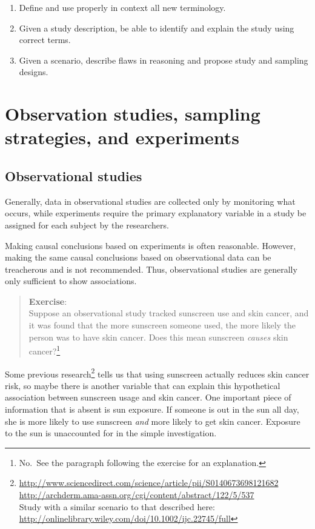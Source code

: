 \documentclass[
]{book}
\providecommand{\tightlist}{%
  \setlength{\itemsep}{0pt}\setlength{\parskip}{0pt}}
\begin{document}
\begin{enumerate}
\def\labelenumi{\arabic{enumi})}
\tightlist
\item
  Define and use properly in context all new terminology.\\
\item
  Given a study description, be able to identify and explain the study using correct terms.\\
\item
  Given a scenario, describe flaws in reasoning and propose study and sampling designs.
\end{enumerate}

\hypertarget{observation-studies-sampling-strategies-and-experiments}{%
\section{Observation studies, sampling strategies, and experiments}\label{observation-studies-sampling-strategies-and-experiments}}

\hypertarget{observational-studies}{%
\subsection{Observational studies}\label{observational-studies}}

Generally, data in observational studies are collected only by monitoring what occurs, while experiments require the primary explanatory variable in a study be assigned for each subject by the researchers.

Making causal conclusions based on experiments is often reasonable. However, making the same causal conclusions based on observational data can be treacherous and is not recommended. Thus, observational studies are generally only sufficient to show associations.

\begin{quote}
\textbf{Exercise}:\\
Suppose an observational study tracked sunscreen use and skin cancer, and it was found that the more sunscreen someone used, the more likely the person was to have skin cancer. Does this mean sunscreen \emph{causes} skin cancer?\footnote{No.~See the paragraph following the exercise for an explanation.}
\end{quote}

Some previous research\footnote{\url{http://www.sciencedirect.com/science/article/pii/S0140673698121682}~\\
  \url{http://archderm.ama-assn.org/cgi/content/abstract/122/5/537}~\\
  Study with a similar scenario to that described here:\\
  \url{http://onlinelibrary.wiley.com/doi/10.1002/ijc.22745/full}} tells us that using sunscreen actually reduces skin cancer risk, so maybe there is another variable that can explain this hypothetical association between sunscreen usage and skin cancer. One important piece of information that is absent is sun exposure. If someone is out in the sun all day, she is more likely to use sunscreen \emph{and} more likely to get skin cancer. Exposure to the sun is unaccounted for in the simple investigation.
\end{document}
